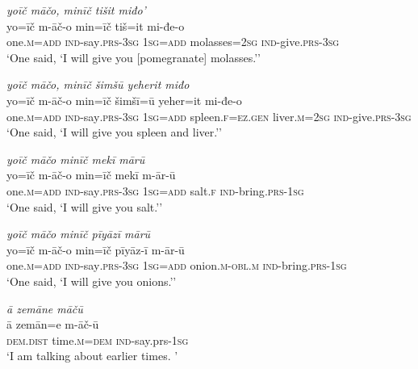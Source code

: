 \ea \label{ŽP.237}
\textit{yoīč māčo, minīč tišit miđo’} \\ 
\gll yo=īč m-āč-o min=īč tiš=it mi-đe-o \\ 
 one\textsc{.m}\textsc{=add} \textsc{ind-}say\textsc{.prs}\textsc{-3sg} \textsc{1sg}\textsc{=add} molasses\textsc{=\textsc{2sg}} \textsc{ind-}give\textsc{.prs}\textsc{-3sg} \\ 
\glt `One said, ‘I will give you [pomegranate] molasses.’'
\z 
 
\ea \label{ŽP.238}
\textit{yoīč māčo, minīč šimšū yeherit miđo} \\ 
\gll yo=īč m-āč-o min=īč šimšī=ū yeher=it mi-đe-o \\ 
 one\textsc{.m}\textsc{=add} \textsc{ind-}say\textsc{.prs}\textsc{-3sg} \textsc{1sg}\textsc{=add} spleen\textsc{.f}\textsc{\textsc{=ez.gen}} liver\textsc{.m}\textsc{=\textsc{2sg}} \textsc{ind-}give\textsc{.prs}\textsc{-3sg} \\ 
\glt `One said, ‘I will give you spleen and liver.’'
\z 
 
\ea \label{ŽP.239}
\textit{yoīč māčo minīč mekī mārū} \\ 
\gll yo=īč m-āč-o min=īč mekī m-ār-ū \\ 
 one\textsc{.m}\textsc{=add} \textsc{ind-}say\textsc{.prs}\textsc{-3sg} \textsc{1sg}\textsc{=add} salt\textsc{.f} \textsc{ind-}bring\textsc{.prs}\textsc{-\textsc{1sg}} \\ 
\glt `One said, ‘I will give you salt.’'
\z 
 
\ea \label{ŽP.240}
\textit{yoīč māčo minīč pīyāzī mārū} \\ 
\gll yo=īč m-āč-o min=īč pīyāz-ī m-ār-ū \\ 
 one\textsc{.m}\textsc{=add} \textsc{ind-}say\textsc{.prs}\textsc{-3sg} \textsc{1sg}\textsc{=add} onion\textsc{.m}\textsc{-obl}\textsc{.m} \textsc{ind-}bring\textsc{.prs}\textsc{-\textsc{1sg}} \\ 
\glt `One said, ‘I will give you onions.’'
\z 
 
\ea \label{BP.19}
\textit{ā zemāne māčū} \\ 
\gll ā zemān=e m-āč-ū \\ 
 \textsc{dem.dist} time\textsc{.m}\textsc{=dem} \textsc{ind-}say.prs\textsc{-\textsc{1sg}} \\ 
\glt `I am talking about earlier times. '
\z 
 
